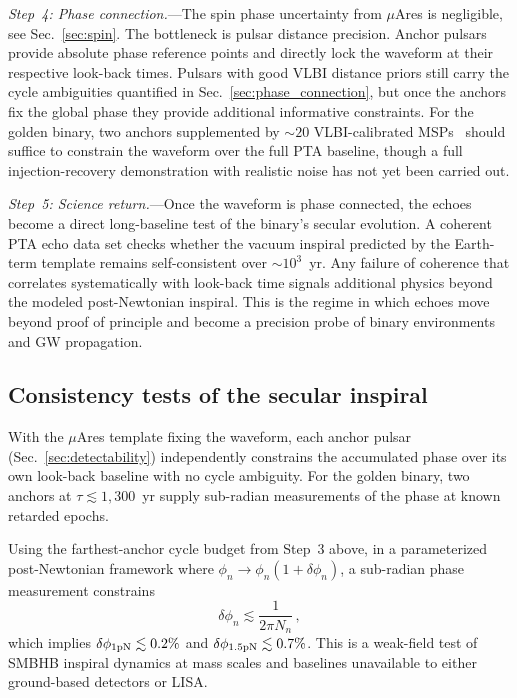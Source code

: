 \documentclass[aps,prx,twocolumn,superscriptaddress,nofootinbib,longbibliography]{revtex4-2}
\begin{document}
\textit{Step~4: Phase connection.}---The spin phase uncertainty from $\mu$Ares is negligible, see Sec.~\ref{sec:spin}. The bottleneck is pulsar distance precision. Anchor pulsars provide absolute phase reference points and directly lock the waveform at their respective look-back times. Pulsars with good VLBI distance priors still carry the cycle ambiguities quantified in Sec.~\ref{sec:phase_connection}, but once the anchors fix the global phase they provide additional informative constraints. For the golden binary, two anchors supplemented by $\sim20$ VLBI-calibrated MSPs~\cite{Deller2019,Ding2023} should suffice to constrain the waveform over the full PTA baseline, though a full injection-recovery demonstration with realistic noise has not yet been carried out.

\textit{Step~5: Science return.}---Once the waveform is phase connected, the echoes become a direct long-baseline test of the binary's secular evolution. A coherent PTA echo data set checks whether the vacuum inspiral predicted by the Earth-term template remains self-consistent over $\sim10^3$~yr. Any failure of coherence that correlates systematically with look-back time signals additional physics beyond the modeled post-Newtonian inspiral. This is the regime in which echoes move beyond proof of principle and become a precision probe of binary environments and GW propagation.

\subsection{Consistency tests of the secular inspiral}

With the $\mu$Ares template fixing the waveform, each anchor pulsar (Sec.~\ref{sec:detectability}) independently constrains the accumulated phase over its own look-back baseline with no cycle ambiguity. For the golden binary, two anchors at $\tau \lesssim 1{,}300$~yr supply sub-radian measurements of the phase at known retarded epochs.

Using the farthest-anchor cycle budget from Step~3 above, in a parameterized post-Newtonian framework where $\phi_n \rightarrow \phi_n(1+\delta\phi_n)$, a sub-radian phase measurement constrains
\begin{equation}\label{eq:dphi_n}
\delta\phi_n \lesssim \frac{1}{2\pi N_n}\, ,
\end{equation}
which implies $\delta\phi_{1\rm pN} \lesssim 0.2\%$ and $\delta\phi_{1.5\rm pN} \lesssim 0.7\%$. This is a weak-field test of SMBHB inspiral dynamics at mass scales and baselines unavailable to either ground-based detectors or LISA.
\end{document}
